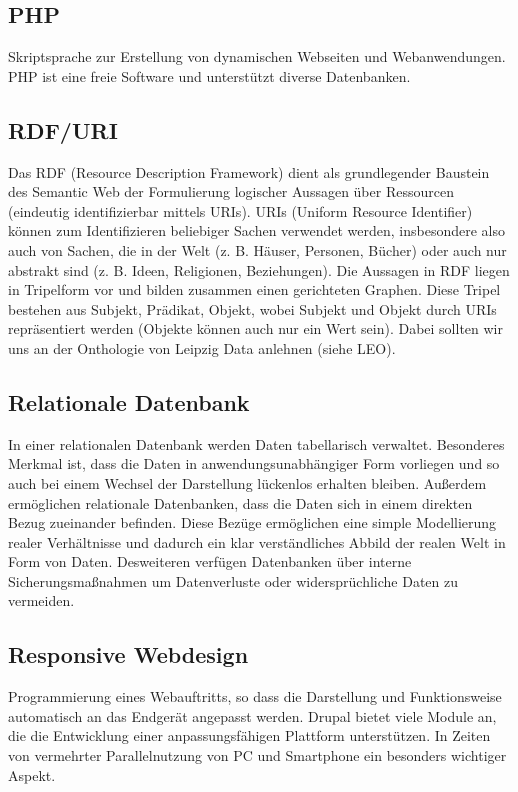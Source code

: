 \documentclass{swp}
\begin{document}
\subsection{PHP}
Skriptsprache zur Erstellung von dynamischen Webseiten und Webanwendungen. PHP ist eine freie Software und unterst\"utzt diverse Datenbanken.
\subsection{RDF/URI}
Das RDF (Resource Description Framework) dient als grundlegender Baustein des Semantic Web der Formulierung logischer Aussagen \"uber Ressourcen (eindeutig identifizierbar mittels URIs). URIs (Uniform Resource Identifier) k\"onnen zum Identifizieren beliebiger Sachen verwendet werden, insbesondere also auch von Sachen, die in der Welt (z. B. H\"auser, Personen, B\"ucher) oder auch nur abstrakt sind (z. B. Ideen, Religionen, Beziehungen). Die Aussagen in RDF liegen in Tripelform vor und bilden zusammen einen gerichteten Graphen. Diese Tripel bestehen aus Subjekt, Pr\"adikat, Objekt, wobei Subjekt und Objekt durch URIs repr\"asentiert werden (Objekte k\"onnen auch nur ein Wert sein). Dabei sollten wir uns an der Onthologie von Leipzig Data anlehnen (siehe LEO).
\subsection{Relationale Datenbank}
In einer relationalen Datenbank werden Daten tabellarisch verwaltet. Besonderes Merkmal ist, dass die Daten in anwendungsunabh\"angiger Form vorliegen und so auch bei einem Wechsel der Darstellung l\"uckenlos erhalten bleiben. Au{\ss}erdem erm\"oglichen relationale Datenbanken, dass die Daten sich in einem direkten Bezug zueinander befinden. Diese Bez\"uge erm\"oglichen eine simple Modellierung realer Verh\"altnisse und dadurch ein klar verst\"andliches Abbild der realen Welt in Form von Daten. Desweiteren verf\"ugen Datenbanken \"uber interne Sicherungsma{\ss}nahmen um Datenverluste oder widerspr\"uchliche Daten zu vermeiden.
\subsection{Responsive Webdesign}
Programmierung eines Webauftritts, so dass die Darstellung und Funktionsweise automatisch an das Endger\"at angepasst werden. Drupal bietet viele Module an, die die Entwicklung einer anpassungsf\"ahigen Plattform unterst\"utzen. In Zeiten von vermehrter Parallelnutzung von PC und Smartphone ein besonders wichtiger Aspekt.
\end{document}
